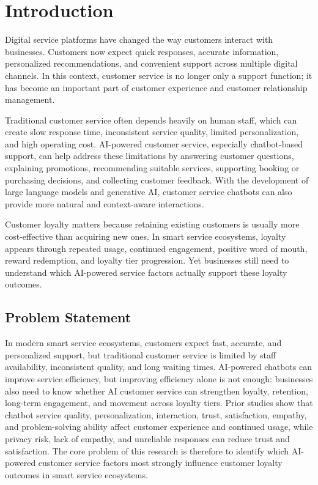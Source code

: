 \documentclass[runningheads]{llncs}
\begin{document}
\section{Introduction}

Digital service platforms have changed the way customers interact with businesses. Customers now expect quick responses, accurate information, personalized recommendations, and convenient support across multiple digital channels. In this context, customer service is no longer only a support function; it has become an important part of customer experience and customer relationship management.

Traditional customer service often depends heavily on human staff, which can create slow response time, inconsistent service quality, limited personalization, and high operating cost. AI-powered customer service, especially chatbot-based support, can help address these limitations by answering customer questions, explaining promotions, recommending suitable services, supporting booking or purchasing decisions, and collecting customer feedback. With the development of large language models and generative AI, customer service chatbots can also provide more natural and context-aware interactions.

Customer loyalty matters because retaining existing customers is usually more cost-effective than acquiring new ones. In smart service ecosystems, loyalty appears through repeated usage, continued engagement, positive word of mouth, reward redemption, and loyalty tier progression. Yet businesses still need to understand which AI-powered service factors actually support these loyalty outcomes.

\subsection{Problem Statement}

In modern smart service ecosystems, customers expect fast, accurate, and personalized support, but traditional customer service is limited by staff availability, inconsistent quality, and long waiting times. AI-powered chatbots can improve service efficiency, but improving efficiency alone is not enough: businesses also need to know whether AI customer service can strengthen loyalty, retention, long-term engagement, and movement across loyalty tiers. Prior studies show that chatbot service quality, personalization, interaction, trust, satisfaction, empathy, and problem-solving ability affect customer experience and continued usage, while privacy risk, lack of empathy, and unreliable responses can reduce trust and satisfaction. The core problem of this research is therefore to identify which AI-powered customer service factors most strongly influence customer loyalty outcomes in smart service ecosystems.
\end{document}
